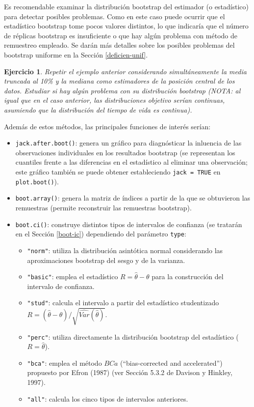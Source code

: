 \documentclass[
  10pt,
]{book}
\theoremstyle{break}
\newtheorem{exercise}{Ejercicio}[chapter]
\theoremstyle{nonumberplain}
\begin{document}
Es recomendable examinar la distribución bootstrap del estimador (o estadístico) para detectar posibles problemas.
Como en este caso puede ocurrir que el estadístico bootstrap tome pocos valores distintos, lo que indicaría que el número de réplicas bootstrap es insuficiente o que hay algún problema con método de remuestreo empleado.
Se darán más detalles sobre los posibles problemas del bootstrap uniforme en la Sección \ref{deficien-unif}.

\begin{exercise}
\protect\hypertarget{exr:boot-simul-mediana}{}\label{exr:boot-simul-mediana}
Repetir el ejemplo anterior considerando simultáneamente la media truncada al 10\% y la mediana como estimadores de la posición central de los datos. Estudiar si hay algún problema con su distribución bootstrap (NOTA: al igual que en el caso anterior, las distribuciones objetivo serían continuas, asumiendo que la distribución del tiempo de vida es continua).
\end{exercise}

Además de estos métodos, las principales funciones de interés serían:

\begin{itemize}
\item
  \texttt{jack.after.boot()}: genera un gráfico para diagnósticar la inluencia
  de las observaciones individuales en los resultados bootstrap
  (se representan los cuantiles frente a las diferencias en el estadístico
  al eliminar una observación; este gráfico también se puede obtener estableciendo
  \texttt{jack\ =\ TRUE} en \texttt{plot.boot()}).
\item
  \texttt{boot.array()}: genera la matriz de índices a partir de la que se obtuvieron las remuestras (permite reconstruir las remuestras bootstrap).
\item
  \texttt{boot.ci()}: construye distintos tipos de intervalos de confianza
  (se tratarán en el Sección \ref{boot-ic}) dependiendo del parámetro \texttt{type}:

  \begin{itemize}
  \item
    \texttt{"norm"}: utiliza la distribución asintótica normal considerando las
    aproximaciones bootstrap del sesgo y de la varianza.
  \item
    \texttt{"basic"}: emplea el estadístico \(R = \hat \theta - \theta\) para la
    construcción del intervalo de confianza.
  \item
    \texttt{"stud"}: calcula el intervalo a partir del estadístico studentizado
    \(R = \left( \hat \theta - \theta \right) / \sqrt{\widehat{Var}(\hat \theta)}\).
  \item
    \texttt{"perc"}: utiliza directamente la distribución bootstrap del estadístico
    (\(R = \hat \theta\)).
  \item
    \texttt{"bca"}: emplea el método \(BCa\) (``bias-corrected and accelerated'')
    propuesto por Efron (1987) (ver Sección 5.3.2 de Davison y Hinkley, 1997).
  \item
    \texttt{"all"}: calcula los cinco tipos de intervalos anteriores.
  \end{itemize}
\end{itemize}
\end{document}
